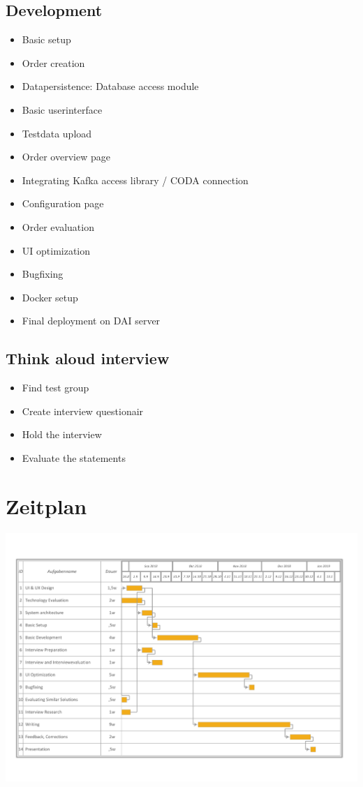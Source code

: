 \documentclass[12pt,a4paper,titlepage,oneside,BCOR1cm]{scrreprt}
\begin{document}
\section{Development}
\begin{itemize}
  \item Basic setup
  \item Order creation
  \item Datapersistence: Database access module
  \item Basic userinterface
  \item Testdata upload
  \item Order overview page
  \item Integrating Kafka access library / CODA connection
  \item Configuration page
  \item Order evaluation
  \item UI optimization  
  \item Bugfixing
  \item Docker setup
  \item Final deployment on DAI server
\end{itemize}
\section{Think aloud interview}
  \begin{itemize}
    \item Find test group
    \item Create interview questionair
    \item Hold the interview
    \item Evaluate the statements
  \end{itemize}

\chapter{Zeitplan}

\hspace*{-1.5in}
\includegraphics[width=\paperwidth]{gantt-proposal-3.pdf}
\end{document}
